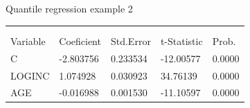 \documentclass{beamer}
\begin{document}
\begin{frame}{Quantile regression example 2}
\begin{table}[]
\begin{tabular}{@{}lllll@{}}
\multicolumn{5}{l}{}                                                                                                                                                                                                                                                                                                                                                                                                                                                          \\
\multicolumn{5}{l}{}                                                                                                                                                                                                                                                                                                                                                                                                                                                          \\ \midrule
Variable                                                                                               & Coeficient                                                                               & Std.Error                                                                              & t-Statistic                                                                              & Prob.                                                                                 \\ \midrule
C                                                                                                      & -2.803756                                                                                & 0.233534                                                                               & -12.00577                                                                                & 0.0000                                                                                \\
LOGINC                                                                                                 & 1.074928                                                                                 & 0.030923                                                                               & 34.76139                                                                                 & 0.0000                                                                                \\
AGE                                                                                                    & -0.016988                                                                                & 0.001530                                                                               & -11.10597                                                                                & 0.0000                                                                                \\

\end{tabular}
\end{table}
\end{frame}
\end{document}
